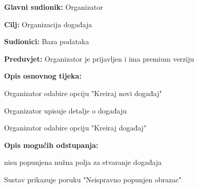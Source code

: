 					\noindent {}
					\begin{packed_item}
	
						\item \textbf{Glavni sudionik:} Organizator
						\item  \textbf{Cilj:} Organizacija događaja
						\item  \textbf{Sudionici:} Baza podataka
						\item  \textbf{Preduvjet:} Organizator je prijavljen i ima premium verziju
						\item  \textbf{Opis osnovnog tijeka:}
						
						\item[] \begin{packed_enum}
	
							\item Organizator odabire opciju "Kreiraj novi događaj"
							\item Organizator upisuje detalje o događaju
							\item Organizator odabire opciju "Kreiraj događaj"

						\end{packed_enum}
						
						\item  \textbf{Opis mogućih odstupanja:}
						
						\item[] \begin{packed_item}
	
							\item[4.a] nisu popunjena nužna polja za stvaranje događaja
							\item[] \begin{packed_enum}
								
								\item Sustav prikazuje poruku "Neispravno popunjen obrazac"
								
							\end{packed_enum}
							
						\end{packed_item}
					\end{packed_item}


